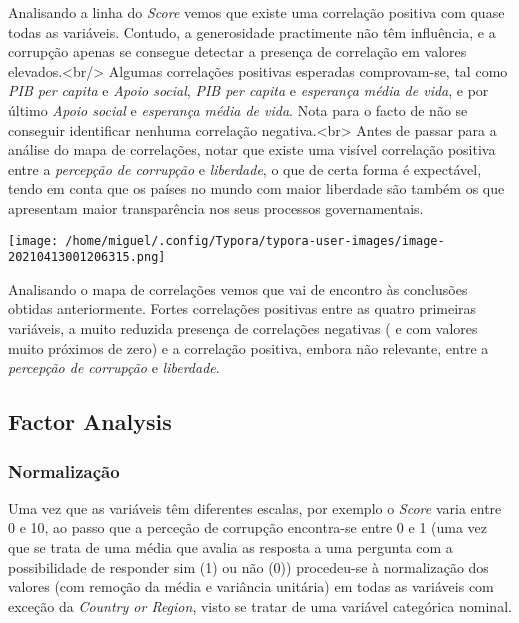 \documentclass[]{article}
\begin{document}
Analisando a linha do \emph{Score} vemos que existe uma correlação
positiva com quase todas as variáveis. Contudo, a generosidade
practimente não têm influência, e a corrupção apenas se consegue
detectar a presença de correlação em valores
elevados.\textless{}br/\textgreater{} Algumas correlações positivas
esperadas comprovam-se, tal como \emph{PIB per capita} e \emph{Apoio
social}, \emph{PIB per capita} e \emph{esperança média de vida}, e por
último \emph{Apoio social} e \emph{esperança média de vida}. Nota para o
facto de não se conseguir identificar nenhuma correlação
negativa.\textless{}br\textgreater{} Antes de passar para a análise do
mapa de correlações, notar que existe uma visível correlação positiva
entre a \emph{percepção de corrupção} e \emph{liberdade}, o que de certa
forma é expectável, tendo em conta que os países no mundo com maior
liberdade são também os que apresentam maior transparência nos seus
processos governamentais.

\texttt{[image: /home/miguel/.config/Typora/typora-user-images/image-20210413001206315.png]}

Analisando o mapa de correlações vemos que vai de encontro às conclusões
obtidas anteriormente. Fortes correlações positivas entre as quatro
primeiras variáveis, a muito reduzida presença de correlações negativas
( e com valores muito próximos de zero) e a correlação positiva, embora
não relevante, entre a \emph{percepção de corrupção} e \emph{liberdade}.

\hypertarget{header-n154}{%
\subsection{Factor Analysis}\label{header-n154}}

\hypertarget{header-n155}{%
\subsubsection{Normalização}\label{header-n155}}

Uma vez que as variáveis têm diferentes escalas, por exemplo o
\emph{Score} varia entre 0 e 10, ao passo que a perceção de corrupção
encontra-se entre 0 e 1 (uma vez que se trata de uma média que avalia as
resposta a uma pergunta com a possibilidade de responder sim (1) ou não
(0)) procedeu-se à normalização dos valores (com remoção da média e
variância unitária) em todas as variáveis com exceção da \emph{Country
or Region}, visto se tratar de uma variável categórica nominal.
\end{document}
